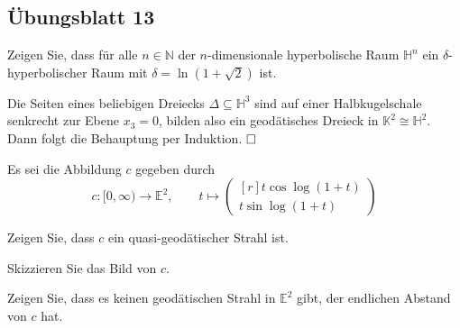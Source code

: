 \documentclass[11pt]{book}
\numberwithin{dummy}{section}
\theoremstyle{nonumberbreak}
\newenvironment{prob}[1][]{\ifthenelse{\equal{#1}{}}{\problem}{\problem[#1]}\rm}{\endproblem}
\newenvironment{sol}[1][]{\ifthenelse{\equal{#1}{}}{\solution}{\solution[#1]}\rm}{\endsolution}
\newcommand{\E}{\mathbb{E}}
\newcommand{\He}{\mathbb{H}}
\newcommand{\la}{\longrightarrow}
\begin{document}
\begin{spacing}{1.4}
\newpage




\titlespacing*{\section}{-16.5pt}{0pt}{20pt}
\renewcommand*\thesection{}
\section{Übungsblatt 13} %
\renewcommand*\thesection{\arabic{section}}




\begin{prob} %
Zeigen Sie, dass für alle $n \in \mathbb{N}$ der $n$-dimensionale hyperbolische Raum $\He^n$ ein $\delta$-hyperbolischer Raum mit $\delta= \ln(1+ \sqrt{2})$ ist.

\begin{sol}
Die Seiten eines beliebigen Dreiecks $\Delta\subseteq \He^3$ sind auf einer Halbkugelschale senkrecht zur Ebene $x_3=0$, bilden also ein geodätisches Dreieck in $\mathbb{K}^2 \cong \He^2$. Dann folgt die Behauptung per Induktion. $\hfill \Box$


\end{sol}

\end{prob}








\begin{prob} %
Es sei die Abbildung $c$ gegeben durch 
$$c:[0,\infty) \la \E^2, \qquad t \mapsto \begin{pmatrix}[r] t \cos\log(1+t) \\ t \sin \log(1+t) \end{pmatrix}$$
\begin{compactenum}
\item Zeigen Sie, dass $c$ ein quasi-geodätischer Strahl ist.
\item Skizzieren Sie das Bild von $c$.
\item Zeigen Sie, dass es keinen geodätischen Strahl in $\E^2$ gibt, der endlichen Abstand von $c$ hat.

\end{compactenum}


\begin{sol}
\begin{compactenum}


\end{compactenum}
\end{sol}
\end{prob}
\end{spacing}
\end{document}
